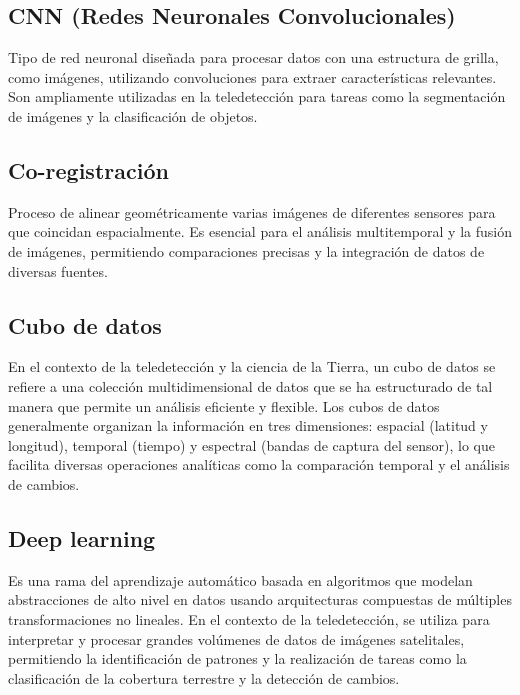             \subsection{CNN (Redes Neuronales Convolucionales)}
                Tipo de red neuronal diseñada para procesar datos con una estructura de grilla, como imágenes, utilizando convoluciones para extraer características relevantes. Son ampliamente utilizadas en la teledetección para tareas como la segmentación de imágenes y la clasificación de objetos.
            
            \subsection{Co-registración}
                Proceso de alinear geométricamente varias imágenes de diferentes sensores para que coincidan espacialmente. Es esencial para el análisis multitemporal y la fusión de imágenes, permitiendo comparaciones precisas y la integración de datos de diversas fuentes.
            
            \subsection{Cubo de datos}
                En el contexto de la teledetección y la ciencia de la Tierra, un cubo de datos se refiere a una colección multidimensional de datos que se ha estructurado de tal manera que permite un análisis eficiente y flexible. Los cubos de datos generalmente organizan la información en tres dimensiones: espacial (latitud y longitud), temporal (tiempo) y espectral (bandas de captura del sensor), lo que facilita diversas operaciones analíticas como la comparación temporal y el análisis de cambios.
            
            \subsection{Deep learning}
                Es una rama del aprendizaje automático basada en algoritmos que modelan abstracciones de alto nivel en datos usando arquitecturas compuestas de múltiples transformaciones no lineales. En el contexto de la teledetección, se utiliza para interpretar y procesar grandes volúmenes de datos de imágenes satelitales, permitiendo la identificación de patrones y la realización de tareas como la clasificación de la cobertura terrestre y la detección de cambios.
            
